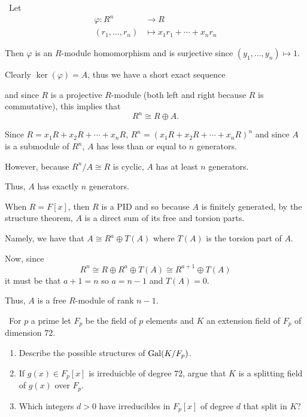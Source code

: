 \documentclass[12pt]{AlgebraQual}
\begin{document}
\begin{solution}$\,$
Let \begin{align*}
    \varphi:R^n&\to R\\
    (r_1,...,r_n)&\mapsto x_1r_1+\cdots+x_nr_n
\end{align*}

Then $\varphi$ is an $R$-module homomorphism and is surjective since $(y_1,...,y_n)\mapsto 1$.

Clearly $\ker(\varphi)=A$, thus we have a short exact sequence \begin{center}
\end{center}

and since $R$ is a projective $R$-module (both left and right because $R$ is commutative), this implies that $$R^n\cong R\oplus A.$$

Since $R=x_1R+x_2R+\cdots+x_nR$, $R^n=(x_1R+x_2R+\cdots+x_nR)^n$ and since $A$ is a submodule of $R^n$, $A$ has less than or equal to $n$ generators.

However, because $R^n/A\cong R$ is cyclic, $A$ has at least $n$ generators.

Thus, $A$ has exactly $n$ generators.

When $R=F[x]$, then $R$ is a PID and so because $A$ is finitely generated, by the structure theorem, $A$ is a direct sum of its free and torsion parts.

Namely, we have that $A\cong R^a\oplus T(A)$ where $T(A)$ is the torsion part of $A$.

Now, since $$R^n\cong R\oplus R^a\oplus T(A)\cong R^{a+1}\oplus T(A)$$ it must be that $a+1=n$ so $a=n-1$ and $T(A)=0$.

Thus, $A$ is a free $R$-module of rank $n-1.$
\end{solution}
\newpage




\begin{problem} $\,$
For $p$ a prime let $F_p$ be the field of $p$ elements and $K$ an extension field of $F_p$ of dimension $72$.
\begin{enumerate}[label=(\alph*)]
    \item Describe the possible structures of $\text{Gal}(K/F_p)$.
    \item If $g(x)\in F_p[x]$ is irreduicble of degree $72$, argue that $K$ is a splitting field of $g(x)$ over $F_p.$
    \item Which integers $d>0$ have irreducibles in $F_p[x]$ of degree $d$ that split in $K?$
\end{enumerate}
\end{problem}
\end{document}
